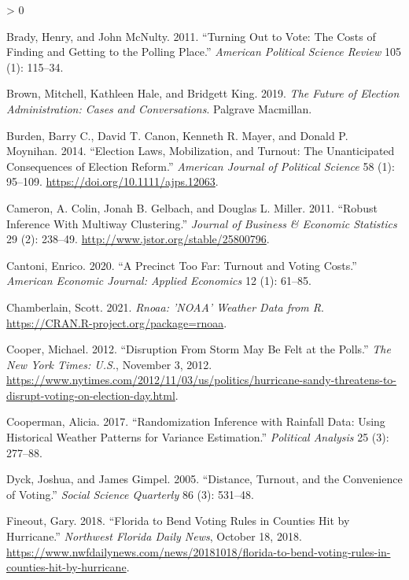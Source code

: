 \documentclass[
  12pt,
]{article}
\newlength{\cslhangindent}
\newenvironment{CSLReferences}[2] %
 {%
  \setlength{\parindent}{0pt}
  \ifodd #1 \everypar{\setlength{\hangindent}{\cslhangindent}}\ignorespaces\fi
  \ifnum #2 > 0
  \setlength{\parskip}{#2\baselineskip}
  \fi
 }%
 {}
\begin{document}
\hypertarget{refs}{}
\begin{CSLReferences}{1}{0}
\leavevmode\hypertarget{ref-Brady2011}{}%
Brady, Henry, and John McNulty. 2011. {``Turning Out to Vote: The {Costs} of {Finding} and {Getting} to the {Polling Place}.''} \emph{American Political Science Review} 105 (1): 115--34.

\leavevmode\hypertarget{ref-Brown2019}{}%
Brown, Mitchell, Kathleen Hale, and Bridgett King. 2019. \emph{The {Future} of {Election Administration}: Cases and {Conversations}}. {Palgrave Macmillan}.

\leavevmode\hypertarget{ref-Burden2014}{}%
Burden, Barry C., David T. Canon, Kenneth R. Mayer, and Donald P. Moynihan. 2014. {``Election {Laws}, {Mobilization}, and {Turnout}: The {Unanticipated Consequences} of {Election Reform}.''} \emph{American Journal of Political Science} 58 (1): 95--109. \url{https://doi.org/10.1111/ajps.12063}.

\leavevmode\hypertarget{ref-Cameron2011}{}%
Cameron, A. Colin, Jonah B. Gelbach, and Douglas L. Miller. 2011. {``Robust {Inference With Multiway Clustering}.''} \emph{Journal of Business \& Economic Statistics} 29 (2): 238--49. \url{http://www.jstor.org/stable/25800796}.

\leavevmode\hypertarget{ref-Cantoni2020}{}%
Cantoni, Enrico. 2020. {``A {Precinct Too Far}: Turnout and {Voting Costs}.''} \emph{American Economic Journal: Applied Economics} 12 (1): 61--85.

\leavevmode\hypertarget{ref-Chamberlain2021}{}%
Chamberlain, Scott. 2021. \emph{Rnoaa: '{NOAA}' {Weather Data} from {R}}. \url{https://CRAN.R-project.org/package=rnoaa}.

\leavevmode\hypertarget{ref-Cooper2012}{}%
Cooper, Michael. 2012. {``Disruption {From Storm May Be Felt} at the {Polls}.''} \emph{The New York Times: U.S.}, November 3, 2012. \url{https://www.nytimes.com/2012/11/03/us/politics/hurricane-sandy-threatens-to-disrupt-voting-on-election-day.html}.

\leavevmode\hypertarget{ref-Cooperman2017}{}%
Cooperman, Alicia. 2017. {``Randomization {Inference} with {Rainfall Data}: Using {Historical Weather Patterns} for {Variance Estimation}.''} \emph{Political Analysis} 25 (3): 277--88.

\leavevmode\hypertarget{ref-Dyck2005}{}%
Dyck, Joshua, and James Gimpel. 2005. {``Distance, {Turnout}, and the {Convenience} of {Voting}.''} \emph{Social Science Quarterly} 86 (3): 531--48.

\leavevmode\hypertarget{ref-Fineout2018}{}%
Fineout, Gary. 2018. {``Florida to Bend Voting Rules in Counties Hit by Hurricane.''} \emph{Northwest Florida Daily News}, October 18, 2018. \url{https://www.nwfdailynews.com/news/20181018/florida-to-bend-voting-rules-in-counties-hit-by-hurricane}.


\end{CSLReferences}
\end{document}
